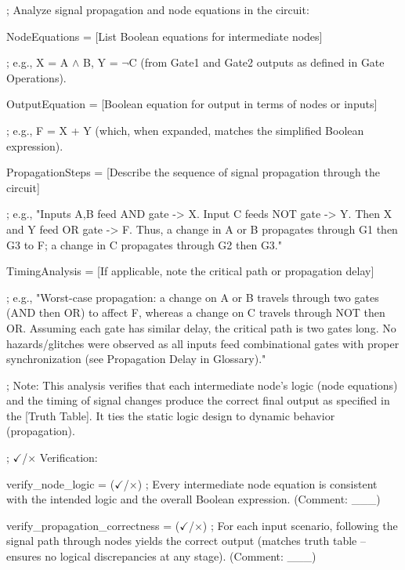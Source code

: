 \documentclass[11pt]{article}
\begin{document}
\vspace{0.5em}


\noindent ; Analyze signal propagation and node equations in the circuit:

\noindent NodeEquations = [List Boolean equations for intermediate nodes]

\noindent ; e.g., X = A $\land$ B, Y = $\lnot$C (from Gate1 and Gate2 outputs as defined in Gate Operations).

\noindent OutputEquation = [Boolean equation for output in terms of nodes or inputs]

\noindent ; e.g., F = X + Y (which, when expanded, matches the simplified Boolean expression).

\noindent PropagationSteps = [Describe the sequence of signal propagation through the circuit]

\noindent ; e.g., "Inputs A,B feed AND gate -> X. Input C feeds NOT gate -> Y. Then X and Y feed OR gate -> F. Thus, a change in A or B propagates through G1 then G3 to F; a change in C propagates through G2 then G3."

\noindent TimingAnalysis = [If applicable, note the critical path or propagation delay]

\noindent ; e.g., "Worst-case propagation: a change on A or B travels through two gates (AND then OR) to affect F, whereas a change on C travels through NOT then OR. Assuming each gate has similar delay, the critical path is two gates long. No hazards/glitches were observed as all inputs feed combinational gates with proper synchronization (see Propagation Delay in Glossary)."

\noindent ; Note: This analysis verifies that each intermediate node's logic (node equations) and the timing of signal changes produce the correct final output as specified in the [Truth Table]. It ties the static logic design to dynamic behavior (propagation).

\vspace{0.5em}

\noindent; $\checkmark$/$\times$ Verification:

\noindent verify\_node\_logic = ($\checkmark$/$\times$) ; Every intermediate node equation is consistent with the intended logic and the overall Boolean expression. (Comment: \_\_\_)

\noindent verify\_propagation\_correctness = ($\checkmark$/$\times$) ; For each input scenario, following the signal path through nodes yields the correct output (matches truth table -- ensures no logical discrepancies at any stage). (Comment: \_\_\_)
\end{document}
